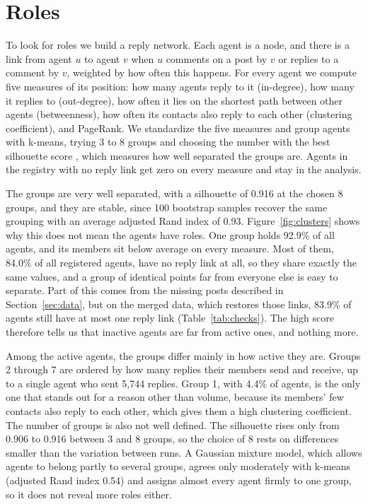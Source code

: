 \documentclass[11pt]{article}
\begin{document}
\section{Roles}
\label{sec:roles}

To look for roles we build a reply network. Each agent is a node, and there is a link from agent $u$ to agent $v$ when $u$ comments on a post by $v$ or replies to a comment by $v$, weighted by how often this happens. For every agent we compute five measures of its position: how many agents reply to it (in-degree), how many it replies to (out-degree), how often it lies on the shortest path between other agents (betweenness), how often its contacts also reply to each other (clustering coefficient), and PageRank. We standardize the five measures and group agents with k-means, trying 3 to 8 groups and choosing the number with the best silhouette score \citep{rousseeuw1987silhouettes}, which measures how well separated the groups are. Agents in the registry with no reply link get zero on every measure and stay in the analysis.

The groups are very well separated, with a silhouette of 0.916 at the chosen 8 groups, and they are stable, since 100 bootstrap samples recover the same grouping with an average adjusted Rand index of 0.93. Figure~\ref{fig:clusters} shows why this does not mean the agents have roles. One group holds 92.9\% of all agents, and its members sit below average on every measure. Most of them, 84.0\% of all registered agents, have no reply link at all, so they share exactly the same values, and a group of identical points far from everyone else is easy to separate. Part of this comes from the missing posts described in Section~\ref{sec:data}, but on the merged data, which restores those links, 83.9\% of agents still have at most one reply link (Table~\ref{tab:checks}). The high score therefore tells us that inactive agents are far from active ones, and nothing more.

Among the active agents, the groups differ mainly in how active they are. Groups 2 through 7 are ordered by how many replies their members send and receive, up to a single agent who sent 5,744 replies. Group 1, with 4.4\% of agents, is the only one that stands out for a reason other than volume, because its members' few contacts also reply to each other, which gives them a high clustering coefficient. The number of groups is also not well defined. The silhouette rises only from 0.906 to 0.916 between 3 and 8 groups, so the choice of 8 rests on differences smaller than the variation between runs. A Gaussian mixture model, which allows agents to belong partly to several groups, agrees only moderately with k-means (adjusted Rand index 0.54) and assigns almost every agent firmly to one group, so it does not reveal more roles either.
\end{document}
